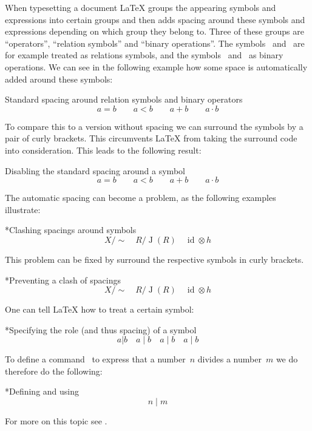 When typesetting a document {\LaTeX} groups the appearing symbols and expressions into certain groups and then adds spacing around these symbols and expressions depending on which group they belong to.
Three of these groups are \enquote{operators}, \enquote{relation symbols} and \enquote{binary operations}.
The symbols~\inlinecode{=} and~\inlinecode{<} are for example treated as relations symbols, and the symbols~\inlinecode{+} and~ as binary operations.
We can see in the following example how some space is automatically added around these symbols:
\begin{showlatex}{Standard spacing around relation symbols and binary operators}
\[
  a = b  \qquad  a < b  \qquad  a + b  \qquad  a \cdot b
\]
\end{showlatex}
To compare this to a version without spacing we can surround the symbols by a pair of curly brackets.
This circumvents {\LaTeX} from taking the surround code into consideration.
This leads to the following result:
\begin{showlatex}{Disabling the standard spacing around a symbol}
\[
  a {=} b   \qquad  a {<} b  \qquad  a {+} b  \qquad  a {\cdot} b
\]
\end{showlatex}
The automatic spacing can become a problem, as the following examples illustrate:
\begin{showlatex}*{Clashing spacings around symbols}
\[
  X/\sim
  \quad
  R/\operatorname{J}(R)
  \quad
  \operatorname{id} \otimes h
\]
\end{showlatex}
This problem can be fixed by surround the respective symbols in curly brackets.
\begin{showlatex}*{Preventing a clash of spacings}
\[
  X/{\sim}
  \quad
  R/{\operatorname{J}(R)}
  \quad
  {\operatorname{id}} \otimes h
\]
\end{showlatex}
One can tell {\LaTeX} how to treat a certain symbol:
\begin{showlatex}*{Specifying the role (and thus spacing) of a symbol}
\[
  a | b
  \quad
  a \mathop{|} b
  \quad
  a \mathrel{|} b
  \quad
  a \mathbin{|} b
\]
\end{showlatex}
To define a command~ to express that a number~$n$ divides a number~$m$ we do therefore do the following:
\begin{showlatex}*{Defining and using }
\newcommand{\divides}{\mathrel{|}}
\[
  n \divides m
\]
\end{showlatex}
For more on this topic see \cite{tex_binrel}.





